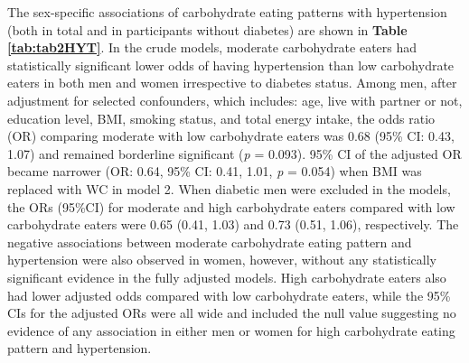 The sex-specific associations of carbohydrate eating patterns with hypertension (both in total and in participants without diabetes) are shown in \textbf{Table \ref{tab:tab2HYT}}. In the crude models, moderate carbohydrate eaters had statistically significant lower odds of having hypertension than low carbohydrate eaters in both men and women irrespective to diabetes status. Among men, after adjustment for selected confounders, which includes: age, live with partner or not, education level, BMI, smoking status, and total energy intake, the odds ratio (OR) comparing moderate with low carbohydrate eaters was 0.68 (95\% CI: 0.43, 1.07) and remained borderline significant (\textit{p} = 0.093). 95\% CI of the adjusted OR became narrower (OR: 0.64, 95\% CI: 0.41, 1.01, \textit{p} = 0.054) when BMI was replaced with WC in model 2. When diabetic men were excluded in the models, the ORs (95\%CI) for moderate and high carbohydrate eaters compared with low carbohydrate eaters were 0.65 (0.41, 1.03) and 0.73 (0.51, 1.06), respectively. The negative associations between moderate carbohydrate eating pattern and hypertension were also observed in women, however, without any statistically significant evidence in the fully adjusted models. High carbohydrate eaters also had lower adjusted odds compared with low carbohydrate eaters, while the 95\% CIs for the adjusted ORs were all wide and included the null value suggesting no evidence of any association in either men or women for high carbohydrate eating pattern and hypertension.

